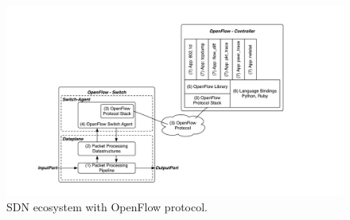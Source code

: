 \begin{figure}[t]
  \begin{minipage}{\textwidth}
      \centering
      \includegraphics[width=1\textwidth]{figures/OpenFlow.pdf}
      \caption[SDN ecosystem with OpenFlow protocol.]{SDN ecosystem with OpenFlow protocol\protect\footnotemark.}
      \label{fig:OpenFlow}
  \end{minipage}  
\end{figure}
